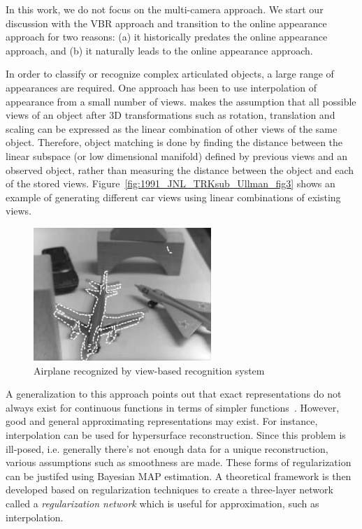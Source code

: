 In this work, we do not focus on the multi-camera approach.  We start our discussion with the VBR approach and transition to the online appearance approach for two reasons: (a) it historically predates the online appearance approach, and (b) it naturally leads to the online appearance approach.

In order to classify or recognize complex articulated objects, a large range of appearances are required.  One approach has been to use interpolation of appearance from a small number of views.  \cite{1991_JNL_Recog_Ullman} makes the assumption that all possible views of an object after 3D transformations such as rotation, translation and scaling can be expressed as the linear combination of other views of the same object.  Therefore, object matching is done by finding the distance between the linear subspace (or low dimensional manifold) defined by previous views and an observed object, rather than measuring the distance between the object and each of the stored views.  Figure~\ref{fig:1991_JNL_TRKsub_Ullman_fig3} shows an example of generating different car views using linear combinations of existing views.  



								\begin{figure}[t]
								\center
								\includegraphics[width=0.6\textwidth]{thesis/1992_JNL_VBR_Breuel_fig1.png}
								\caption{Airplane recognized by view-based recognition system \cite{1992_JNL_VBR_Breuel}}
								\label{fig:1992_JNL_VBR_Breuel_fig1}
								\end{figure}

A generalization to this approach points out that exact representations do not always exist for continuous functions in terms of simpler functions~\cite{1990_JNL_Network_Poggio}.  However, good and general approximating representations may exist.  For instance, interpolation can be used for hypersurface reconstruction.  Since this problem is ill-posed, i.e. generally there's not enough data for a unique reconstruction, various assumptions such as smoothness are made.  These forms of regularization can be justifed using Bayesian MAP estimation.  A theoretical framework is then developed based on regularization techniques to create a three-layer network called a \emph{regularization network} which is useful for approximation, such as interpolation.

